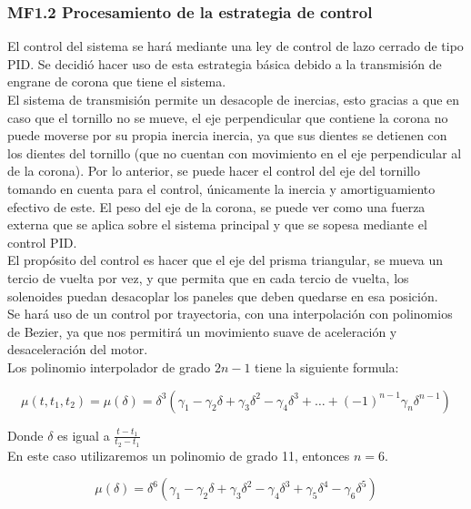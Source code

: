 \subsubsection{MF1.2 Procesamiento de la estrategia de control}

El control del sistema se hará mediante una ley de control de lazo cerrado de tipo PID. Se decidió hacer uso de esta estrategia básica debido a la transmisión de engrane de corona que tiene el sistema. \\
El sistema de transmisión permite un desacople de inercias, esto gracias a que en caso que el tornillo no se mueve, el eje perpendicular que contiene la corona no puede moverse por su propia inercia inercia, ya que sus dientes se detienen con los dientes del tornillo (que no cuentan con movimiento en el eje perpendicular al de la corona). Por lo anterior, se puede hacer el control del eje del tornillo tomando en cuenta para el control, únicamente la inercia y amortiguamiento efectivo de este. El peso del eje de la corona, se puede ver como una fuerza externa que se aplica sobre el sistema principal y que se sopesa mediante el control PID. \\
El propósito del control es hacer que el eje del prisma triangular, se mueva un tercio de vuelta por vez, y que permita que en cada tercio de vuelta, los solenoides puedan desacoplar los paneles que deben quedarse en esa posición. \\
Se hará uso de un control por trayectoria, con una interpolación con polinomios de Bezier, ya que nos permitirá un movimiento suave de aceleración y desaceleración del motor. \\
Los polinomio interpolador de grado $2n-1$ tiene la siguiente formula:

\begin{dmath}
    \mu(t, t_1, t_2) = \mu(\delta) = \delta^{3}\left(\gamma_1 - \gamma_2\delta + \gamma_3\delta^{2} - \gamma_4\delta^{3} + \dots + \left(-1 \right)^{n-1}\gamma_n\delta^{n-1}  \right) 
\end{dmath}

Donde $\delta$ es igual a $\frac{t - t_1}{t_2 - t_1}$ \\
En este caso utilizaremos un polinomio de grado 11, entonces $n = 6$.

\begin{dmath}
    \mu(\delta) = \delta^{6}\left(\gamma_1 - \gamma_2\delta + \gamma_3\delta^{2} - \gamma_4\delta^{3}+ \gamma_5\delta^{4} - \gamma_6\delta^{5} \right) 
\end{dmath}

